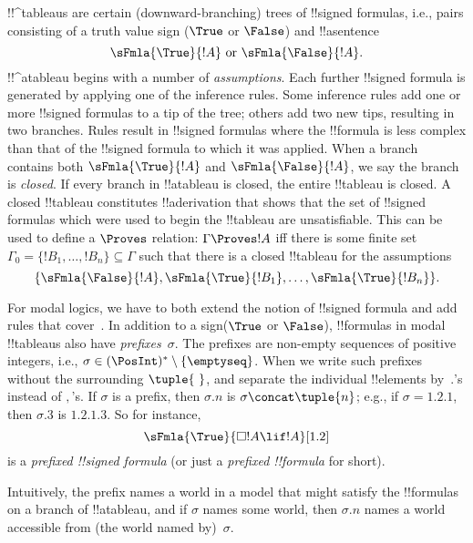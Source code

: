 \documentclass[../../../include/open-logic-section]{subfiles}
\begin{document}

!!^{tableau}s are certain (downward-branching) trees of !!{signed
  formula}s, i.e., pairs consisting of a truth value sign ($\True$ or
$\False$) and !!a{sentence}
\[
\sFmla{\True}{!A} \text{ or } \sFmla{\False}{!A}.
\]
!!^a{tableau} begins with a number of \emph{assumptions}. Each further
!!{signed formula} is generated by applying one of the inference
rules. Some inference rules add one or more !!{signed formula}s to a
tip of the tree; others add two new tips, resulting in two branches.
Rules result in !!{signed formula}s where the !!{formula} is
less complex than that of the !!{signed formula} to which it was
applied. When a branch contains both $\sFmla{\True}{!A}$ and
$\sFmla{\False}{!A}$, we say the branch is \emph{closed}. If every
branch in !!a{tableau} is closed, the entire !!{tableau} is closed. A
closed !!{tableau} constitutes !!a{derivation} that shows that the set
of !!{signed formula}s which were used to begin the !!{tableau} are
unsatisfiable.  This can be used to define a $\Proves$ relation:
$\Gamma \Proves !A$ iff there is some finite set~$\Gamma_0 = \{!B_1,
\dots, !B_n\} \subseteq \Gamma$ such that there is a closed
!!{tableau} for the assumptions
\[
\{\sFmla{\False}{!A}, \sFmla{\True}{!B_1}, \dots, \sFmla{\True}{!B_n}\}.
\]

For modal logics, we have to both extend the notion of !!{signed
formula} and add rules that
cover~. In addition to a sign($\True$ or
$\False$), !!{formula}s in modal !!{tableau}s also have
\emph{prefixes}~$\sigma$. The prefixes are non-empty sequences of
positive integers, i.e., $\sigma \in (\PosInt)^* \setminus
\{\emptyseq\}$. When we write such prefixes without the surrounding
$\tuple{\ }$, and separate the individual !!{element}s by~$.$'s
instead of $,$'s. If $\sigma$ is a prefix, then $\sigma.n$ is $\sigma
\concat \tuple{n}$; e.g., if $\sigma = 1.2.1$, then $\sigma.3$ is
$1.2.1.3$. So for instance,
\[
\sFmla{\True}{\Box !A \lif !A}[1.2]
\]
is a \emph{prefixed !!{signed formula}} (or just a \emph{prefixed
  !!{formula}} for short).

Intuitively, the prefix names a world in a model that might satisfy
the !!{formula}s on a branch of !!a{tableau}, and if $\sigma$ names
some world, then $\sigma.n$ names a world accessible from (the world
named by)~$\sigma$.
\end{document}

